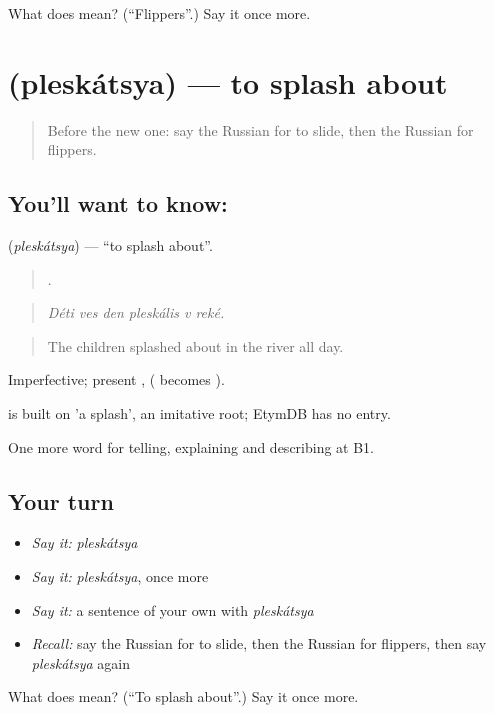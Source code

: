 \begin{tcolorbox}[breakable,colback=teal!4,colframe=teal!35!black,title={Before you move on}]
What does  mean? (\textquotedblleft{}Flippers\textquotedblright{}.) Say it once more.
\end{tcolorbox}
\section[\texorpdfstring{\ru{плескаться} (pleskátsya)}{плескаться (pleskátsya)}]{ (pleskátsya) — to splash about}

\label{lesson:RU-C514-pleskatsya}



\begin{quote}
Before the new one: say the Russian for to slide, then the Russian for flippers.
\end{quote}

\subsection*{You'll want to know: }
\textbf{} (\emph{pleskátsya}) — \textquotedblleft{}to splash about\textquotedblright{}.

\begin{quote}
     .
\end{quote}

\begin{quote}
\emph{Déti ves den pleskális v reké.}
\end{quote}

\begin{quote}
The children splashed about in the river all day.
\end{quote}

Imperfective; present ,  ( becomes ).

\begin{cousinweb}
\emph{} is built on \emph{} 'a splash', an imitative root; EtymDB has no entry.
\end{cousinweb}

\begin{grammarlens}[title={What you've built}]
One more word for telling, explaining and describing at B1.
\end{grammarlens}

\subsection*{Your turn}
\begin{itemize}
\raggedright
  \item \emph{Say it:} \emph{pleskátsya}
  \item \emph{Say it:} \emph{pleskátsya}, once more
  \item \emph{Say it:} a sentence of your own with \emph{pleskátsya}
  \item \emph{Recall:} say the Russian for to slide, then the Russian for flippers, then say \emph{pleskátsya} again
\end{itemize}

\begin{tcolorbox}[breakable,colback=teal!4,colframe=teal!35!black,title={Before you move on}]
What does  mean? (\textquotedblleft{}To splash about\textquotedblright{}.) Say it once more.
\end{tcolorbox}
